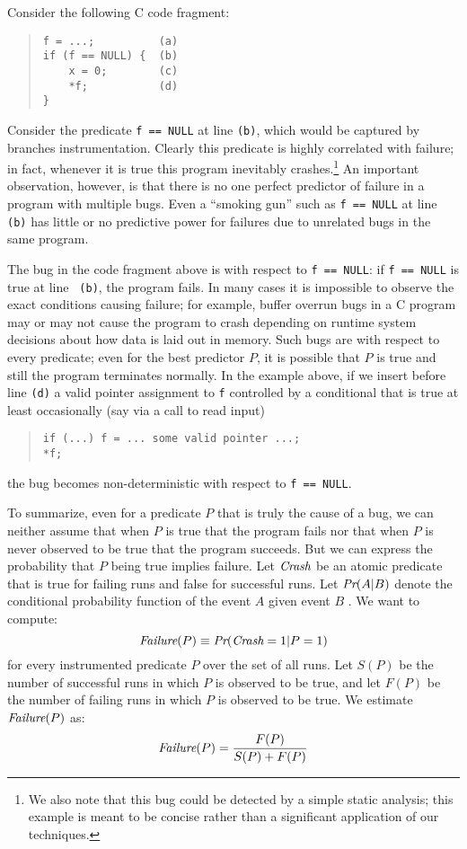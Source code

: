 Consider the following C code fragment:
\begin{quote}
\begin{verbatim}
f = ...;          (a)
if (f == NULL) {  (b)
    x = 0;        (c)
    *f;           (d)
}
\end{verbatim}
\end{quote}
Consider the predicate {\tt f == NULL} at line {\tt (b)}, which would
be captured by branches instrumentation.  Clearly
this predicate is highly correlated with failure; in fact, whenever it
is true this program inevitably crashes.\footnote{We also note that this bug could 
be detected by a simple static analysis; this example is meant to be concise rather than 
a significant application of our techniques.}   An important observation,
however, is that there is no one perfect predictor of failure in a
program with multiple bugs.  Even a ``smoking gun'' such as {\tt f ==
  NULL} at line {\tt (b)} has little or no predictive power for
failures due to unrelated bugs in the same program.

The bug in the code fragment above is  with
respect to {\tt f == NULL}: if {\tt f == NULL} is true at line {\tt
(b)}, the program fails.  In many cases it is impossible to observe
the exact conditions causing failure; for example, buffer overrun bugs
in a C program may or may not cause the program to crash depending on
runtime system decisions about how data is laid out in memory.  Such
bugs are  with respect to every predicate;
even for the best predictor $P$, it is possible
that $P$ is true and still the program terminates normally.  In the
example above, if we insert before line {\tt (d)} a valid pointer
assignment to {\tt f} controlled by a conditional that is true at
least occasionally (say via a call to read input)
\begin{quote}
\begin{verbatim}
if (...) f = ... some valid pointer ...;
*f;
\end{verbatim}
\end{quote}
the bug becomes non-deterministic with respect to {\tt f == NULL}.

To summarize, even for a predicate $P$ that is truly the cause of a bug, we can neither assume that
when $P$ is true that
the program fails nor that when $P$ is never observed to be true  that
the program succeeds.
But we can express the probability that $P$
being true implies failure.  Let $\textit{Crash}$ be an atomic predicate that is
true for failing runs and false for successful runs.  Let $\textit{Pr}(A | B)$ denote
the conditional probability function of the event $A$ given event $B$ .  
We want to compute:
\[ \textit{Failure}(P) \equiv \textit{Pr}(\textit{Crash} = 1 | P = 1) \]
for every instrumented predicate $P$ over the set of all runs.  Let $S(P)$ be the number
of successful runs in which $P$ is observed to be true, and let $F(P)$ be the number of
failing runs in which $P$ is observed to be true.  
We estimate $\textit{Failure}(P)$ as:
\[ \textit{Failure}(P) = \frac{F(P)}{S(P) + F(P)} \]

